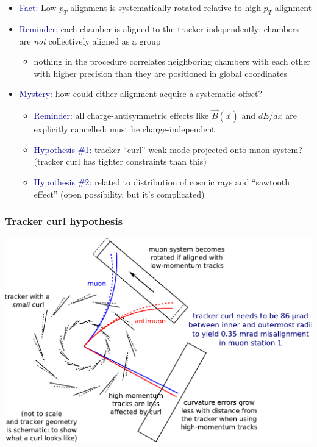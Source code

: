 \documentclass[compress]{beamer}
\begin{document}
\begin{frame}
\frametitle{\mbox{ }}

\begin{itemize}\setlength{\itemsep}{0.2 cm}
\item \textcolor{darkblue}{Fact:} Low-$p_T$ alignment is systematically rotated relative to high-$p_T$ alignment
\item \textcolor{darkblue}{Reminder:} each chamber is aligned to the tracker independently; chambers are {\it not} collectively aligned as a group
\begin{itemize}
\item nothing in the procedure correlates neighboring chambers with each other with higher precision than they are positioned in global coordinates
\end{itemize}
\item \textcolor{darkblue}{Mystery:} how could either alignment acquire a systematic offset?
\begin{itemize}\setlength{\itemsep}{0.2 cm}
\item \textcolor{darkblue}{Reminder:} all charge-antisymmetric effects like $\vec{B}(\vec{x})$ and $dE/dx$ are explicitly cancelled: must be charge-independent
\item \textcolor{darkblue}{Hypothesis \#1:} tracker ``curl'' weak mode projected onto muon system?  (tracker curl has tighter constraints than this)
\item \textcolor{darkblue}{Hypothesis \#2:} related to distribution of cosmic rays and ``sawtooth effect'' (open possibility, but it's complicated)
\end{itemize}
\end{itemize}
\end{frame}

\begin{frame}
\frametitle{Tracker curl hypothesis}
\includegraphics[width=\linewidth]{curl_explanation.pdf}
\end{frame}
\end{document}
